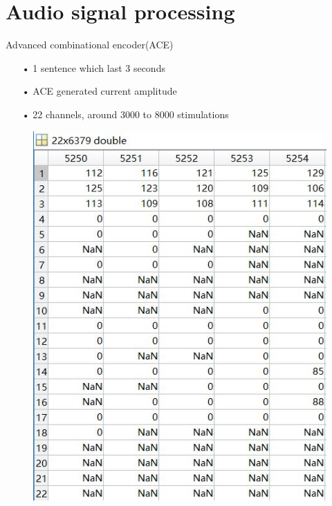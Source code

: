 \documentclass[notes=hide]{beamer}
\begin{document}
\section{Audio signal processing}
\begin{frame}


   \begin{block}{Advanced combinational encoder(ACE)}
   	\begin{itemize}
		\item [•] 1 sentence which last 3 seconds 
   		\item [•] ACE generated current amplitude
   		\item [•] 22 channels, around 3000 to 8000 stimulations
   	\end{itemize}
   \end{block}
   \begin{figure}
   	\includegraphics[scale=0.4]{Vortrag/ACE.JPG}
   \end{figure}
\end{frame}


\newpage
\end{document}

